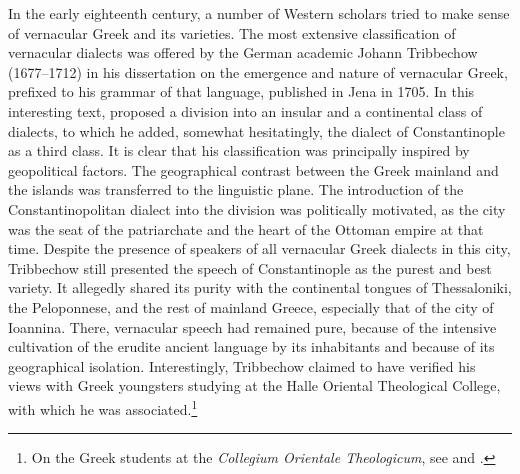 {In the early eighteenth century, a number of Western scholars tried to make sense of vernacular Greek and its varieties. The most extensive classification of vernacular dialects was offered by the German academic Johann Tribbechow (1677–1712) in his dissertation on the emergence and nature of vernacular Greek, prefixed to his grammar of that language, published in Jena in 1705. In this interesting text, \citet[a.4\textsc{\textsuperscript{r}}\textsc{–}a.4\textsc{\textsuperscript{v}}]{Tribbechow1705} proposed a division into an insular and a continental class of dialects, to which he added, somewhat hesitatingly, the dialect of Constantinople as a third class. It is clear that his classification was principally inspired by geopolitical factors. The geographical contrast between the Greek mainland and the islands was transferred to the linguistic plane. The introduction of the Constantinopolitan dialect into the division was politically motivated, as the city was the seat of the patriarchate and the heart of the Ottoman empire at that time. Despite the presence of speakers of all vernacular Greek dialects in this city, Tribbechow still presented the speech of Constantinople as the purest and best variety. It allegedly shared its purity with the continental tongues of Thessaloniki, the Peloponnese, and the rest of mainland Greece, especially that of the city of Ioannina. There, vernacular speech had remained pure, because of the intensive cultivation of the erudite ancient language by its inhabitants and because of its geographical isolation. Interestingly, Tribbechow claimed to have verified his views with Greek youngsters studying at the Halle Oriental Theological College, with which he was associated.\footnote{On the Greek students at the \textit{Collegium Orientale Theologicum}, see \citet{Moennig1998} and \citet[283]{Makrides2006}.}

}
